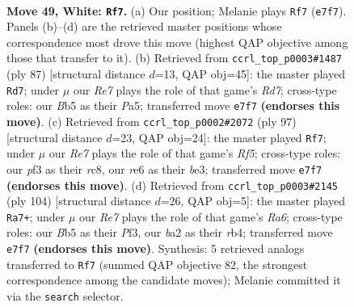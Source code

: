 \documentclass[11pt]{article}
\begin{document}
\clearpage

\begin{figure}[p]\centering
\begin{subfigure}{0.46\textwidth}\centering
\resizebox{\linewidth}{!}{%
\newchessgame
\chessboard[
  setfen={7k/4R3/4r3/1B6/4p2p/4Bp1P/b4P1K/8 w - - 8 49},
  showmover=false,
  pgfstyle=straightmove, color=movearrow, markmove={e7-f7}
]}
\caption{}
\end{subfigure}\hfill
\begin{subfigure}{0.46\textwidth}\centering
\resizebox{\linewidth}{!}{%
\newchessgame
\chessboard[
  setfen={8/7B/8/p5k1/P6p/1P4bP/2Rr2P1/5K2 b - - 3 44},
  showmover=false,
  pgfstyle=straightmove, color=movearrow, markmove={d2-d7}
]}
\caption{}
\end{subfigure}
\\[4pt]
\begin{subfigure}{0.46\textwidth}\centering
\resizebox{\linewidth}{!}{%
\newchessgame
\chessboard[
  setfen={2R5/6pk/4p3/3b3P/5r2/4B2P/5P1K/8 b - - 6 49},
  showmover=false,
  pgfstyle=straightmove, color=movearrow, markmove={f4-f7}
]}
\caption{}
\end{subfigure}\hfill
\begin{subfigure}{0.46\textwidth}\centering
\resizebox{\linewidth}{!}{%
\newchessgame
\chessboard[
  setfen={8/4k1p1/R3b1Bp/5p1P/1r6/5P2/6PK/8 w - - 16 53},
  showmover=false,
  pgfstyle=straightmove, color=movearrow, markmove={a6-a7}
]}
\caption{}
\end{subfigure}
\caption{\textbf{Move 49, White: \texttt{Rf7}.} (a) Our position; Melanie plays \texttt{Rf7} (\texttt{e7f7}). Panels (b)--(d) are the retrieved master positions whose correspondence most drove this move (highest QAP objective among those that transfer to it). (b) Retrieved from \texttt{ccrl\_top\_p0003\#1487} (ply 87) [structural distance $d$=13, QAP obj=45]: the master played \texttt{Rd7}; under $\mu$ our \emph{Re7} plays the role of that game's \emph{Rd7}; cross-type roles: our \emph{B}b5 as their \emph{P}a5; transferred move \texttt{e7f7} \textbf{(endorses this move)}. (c) Retrieved from \texttt{ccrl\_top\_p0002\#2072} (ply 97) [structural distance $d$=23, QAP obj=24]: the master played \texttt{Rf7}; under $\mu$ our \emph{Re7} plays the role of that game's \emph{Rf5}; cross-type roles: our \emph{p}f3 as their \emph{r}c8, our \emph{r}e6 as their \emph{b}e3; transferred move \texttt{e7f7} \textbf{(endorses this move)}. (d) Retrieved from \texttt{ccrl\_top\_p0003\#2145} (ply 104) [structural distance $d$=26, QAP obj=5]: the master played \texttt{Ra7+}; under $\mu$ our \emph{Re7} plays the role of that game's \emph{Ra6}; cross-type roles: our \emph{B}b5 as their \emph{P}f3, our \emph{b}a2 as their \emph{r}b4; transferred move \texttt{e7f7} \textbf{(endorses this move)}. Synthesis: 5 retrieved analogs transferred to \texttt{Rf7} (summed QAP objective 82, the strongest correspondence among the candidate moves); Melanie committed it via the \texttt{search} selector.}
\label{fig:thought-m96}
\end{figure}
\end{document}
